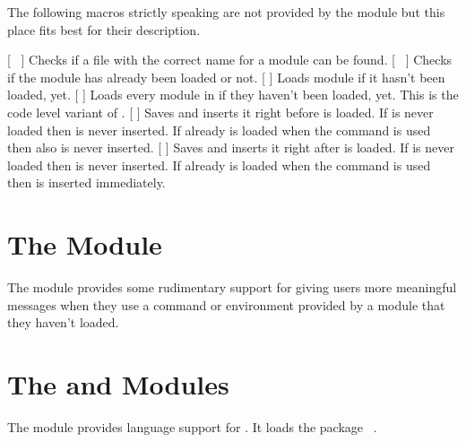 \documentclass{chemmacros-manual}
\begin{document}
The following macros strictly speaking are not provided by the
 module but this place fits best for their description.
\begin{commands}
  \expandable{}[\TF\ 
   ]
    Checks if a file with the correct name for a module  can be
    found.
  \expandable{}[\TF\ 
   ]
    Checks if the module  has already been loaded or not.
  [ ]
    Loads module  if it hasn't been loaded, yet.
  [ ]
    Loads every module in  if they haven't been
    loaded, yet. This is the code level variant of .
  [  ]
    Saves  and inserts it right before
     is loaded.  If  is never loaded then
     is never inserted.  If  already is loaded when
    the command is used then  also is never inserted.
  [  ]
    Saves  and inserts it right after
     is loaded.  If  is never loaded then
     is never inserted.  If  already is loaded when
    the command is used then  is inserted immediately.
\end{commands}

\section{The  Module}\label{sec:errorcheck-module}
The  module provides some rudimentary
support for giving users more meaningful messages when they use a command or
environment provided by a module that they haven't loaded.

\section{The  and  Modules}\label{sec:lang-module}

The  module provides language support for \chemmacros.  It
loads the package ~\cite{pkg:translations}.
\end{document}
